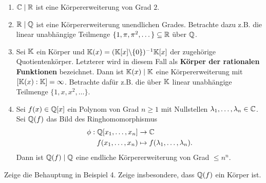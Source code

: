 \begin{beispiele}
\begin{enumerate}
\item $\mathbb{C} \mid \mathbb{R}$ ist eine Körpererweiterung von Grad $2$.
\item $\mathbb{R} \mid \mathbb{Q}$ ist eine Körpererweiterung unendlichen Grades. Betrachte dazu z.B. die linear unabhängige Teilmenge $\{1,\pi,\pi^2,\dots\} \subseteq \mathbb{R}$ über $\mathbb{Q}$.
\item Sei $\mathbb{K}$ ein Körper und $\mathbb{K}(x)=(\mathbb{K}[x] \backslash \{0\})^{-1}\mathbb{K}[x]$ der zugehörige Quotientenkörper. Letzterer wird in diesem Fall als \textbf{Körper der rationalen Funktionen} bezeichnet. Dann ist $\mathbb{K}(x) \mid \mathbb{K}$ eine Körpererweiterung mit $[\mathbb{K}(x):\mathbb{K}] = \infty$. Betrachte dafür z.B. die über $\mathbb{K}$ linear unabhängige Teilmenge $\{1,x,x^2,\dots\}$.
\item Sei $f(x) \in \mathbb{Q}[x]$ ein Polynom von Grad $n \geq 1$ mit Nullstellen $\lambda_1, \dots, \lambda_n \in \mathbb{C}$. Sei $\mathbb{Q}(f)$ das Bild des Ringhomomorphismus
\begin{equation}
\begin{split}
\phi: \mathbb{Q}[x_1, \dots, x_n] &\to \mathbb{C}\\
f(x_1, \dots, x_n) &\mapsto f(\lambda_1, \dots, \lambda_n).
\end{split}
\end{equation}
Dann ist $\mathbb{Q}(f) \mid \mathbb{Q}$ eine endliche Körpererweiterung von Grad $\leq n^n$.
\end{enumerate}
\end{beispiele}
\begin{übung}
Zeige die Behauptung in Beispiel 4. Zeige insbesondere, dass $\mathbb{Q}(f)$ ein Körper ist.
\end{übung}


